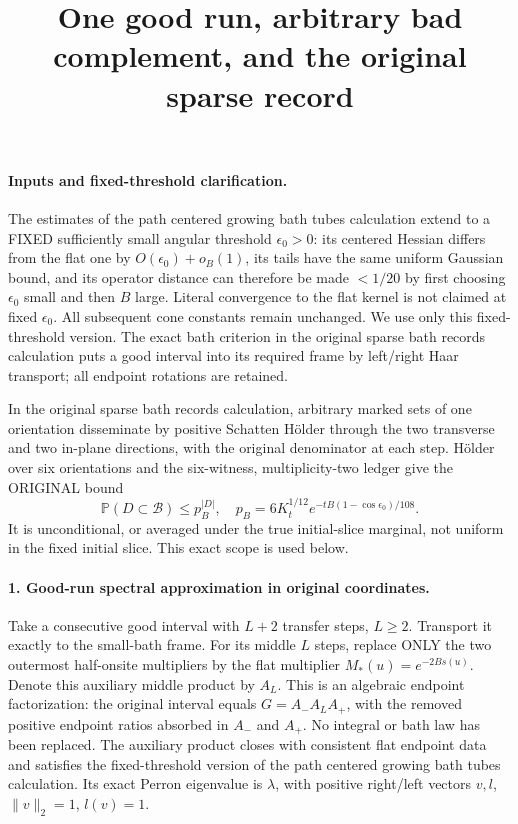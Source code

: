 \documentclass[11pt]{article}
\title{One good run, arbitrary bad complement, and the original sparse record}\author{}\date{}
\begin{document}
\maketitle
\paragraph{Inputs and fixed-threshold clarification.}
The estimates of the path centered growing bath tubes calculation extend to a FIXED sufficiently small angular threshold
$\epsilon_0>0$: its centered Hessian differs from the flat one by
$O(\epsilon_0)+o_B(1)$, its tails have the same uniform Gaussian bound, and its
operator distance can therefore be made $<1/20$ by first choosing $\epsilon_0$
small and then $B$ large. Literal convergence to the flat kernel is not claimed
at fixed $\epsilon_0$. All subsequent cone constants remain unchanged.
We use only this fixed-threshold version. The exact bath criterion in the original sparse bath records calculation
puts a good interval into its required frame by left/right Haar transport;
all endpoint rotations are retained.

In the original sparse bath records calculation, arbitrary marked sets of one
orientation disseminate by positive Schatten H\"older through the two
transverse and two in-plane directions, with the original denominator at each
step. H\"older over six orientations and the six-witness, multiplicity-two
ledger give the ORIGINAL bound
\[
 \mathbb P(D\subset\mathcal B)\le p_B^{|D|},\quad
 p_B=6K_t^{1/12}e^{-tB(1-\cos\epsilon_0)/108}.                            \tag{1}
\]
It is unconditional, or averaged under the true initial-slice marginal, not
uniform in the fixed initial slice. This exact scope is used below.

\paragraph{1. Good-run spectral approximation in original coordinates.}
Take a consecutive good interval with $L+2$ transfer steps, $L\ge2$.
Transport it exactly to the small-bath frame. For its middle $L$ steps, replace
ONLY the two outermost half-onsite multipliers by the flat multiplier
$M_*(u)=e^{-2Bs(u)}$. Denote this auxiliary middle product by $A_L$.
This is an algebraic endpoint factorization: the original interval equals
$G=A_- A_L A_+$, with the removed positive endpoint ratios absorbed in $A_-$
and $A_+$. No integral or bath law has been replaced. The auxiliary product
closes with consistent flat endpoint data and satisfies the fixed-threshold
version of the path centered growing bath tubes calculation. Its exact Perron eigenvalue is $\lambda$, with positive
right/left vectors $v,l$, $\|v\|_2=1$, $l(v)=1$.
\end{document}
